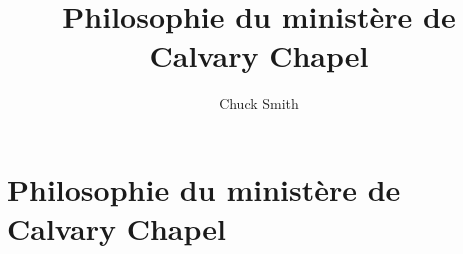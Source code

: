 \documentclass[paper=a5,pagesize=pdftex,12pt]{scrbook}
\title{Philosophie du ministère de Calvary Chapel}
\author{Chuck Smith}
\begin{document}
\maketitle

\chapter*{Philosophie du ministère de Calvary Chapel}


\end{document}
